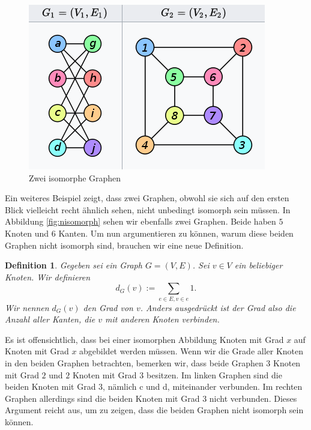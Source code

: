 \documentclass{article}
\newtheorem{definition}{Definition}
\begin{document}
\begin{figure}
\centering
\includegraphics[scale=0.8]{isomorph.png}
\caption{Zwei isomorphe Graphen}\label{fig:isomorph}
\end{figure}


Ein weiteres Beispiel zeigt, dass zwei Graphen, obwohl sie sich auf den ersten Blick vielleicht recht ähnlich sehen, nicht unbedingt isomorph sein müssen. In Abbildung \ref{fig:nisomorph} sehen wir ebenfalls zwei Graphen. Beide haben $5$ Knoten und $6$ Kanten. Um nun argumentieren zu können, warum diese beiden Graphen nicht isomorph sind, brauchen wir eine neue Definition.

\begin{definition}
Gegeben sei ein Graph $G = (V,E)$. Sei $v\in V$ ein beliebiger Knoten. Wir definieren $$d_G(v) := \sum_{e\in E, v\in e} 1.$$
Wir nennen $d_G(v)$ den Grad von $v$. Anders ausgedrückt ist der Grad also die Anzahl aller Kanten, die $v$ mit anderen Knoten verbinden.
\end{definition}

Es ist offensichtlich, dass bei einer isomorphen Abbildung Knoten mit Grad $x$ auf Knoten mit Grad $x$ abgebildet werden müssen.
Wenn wir die Grade aller Knoten in den beiden Graphen betrachten, bemerken wir, dass beide Graphen $3$ Knoten mit Grad $2$ und $2$ Knoten mit Grad $3$ besitzen. Im linken Graphen sind die beiden Knoten mit Grad $3$, nämlich c und d, miteinander verbunden. Im rechten Graphen allerdings sind die beiden Knoten mit Grad $3$ nicht verbunden. Dieses Argument reicht aus, um zu zeigen, dass die beiden Graphen nicht isomorph sein können. 
\end{document}
